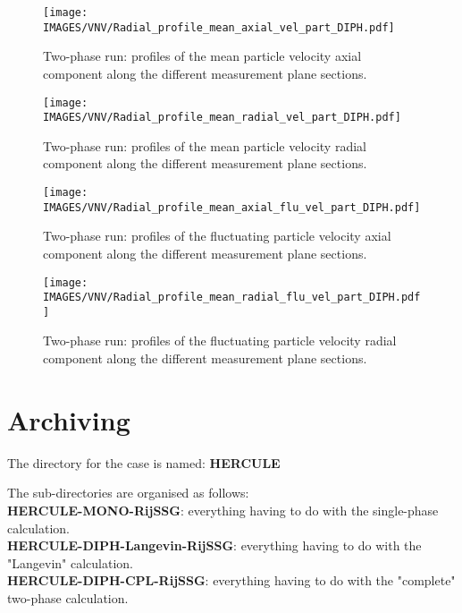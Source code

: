 \noindent

\begin{figure}[H]
   \centerline{\texttt{[image: \\IMAGES/VNV/Radial\_profile\_mean\_axial\_vel\_part\_DIPH.pdf]}}
   \caption{Two-phase run: profiles of the mean particle velocity axial component along the different measurement plane sections.}
   \label{VitZPart}
\end{figure}

\begin{figure}[H]
   \centerline{\texttt{[image: \\IMAGES/VNV/Radial\_profile\_mean\_radial\_vel\_part\_DIPH.pdf]}}
   \caption{Two-phase run: profiles of the mean particle velocity radial component along the different measurement plane sections.}
   \label{VitXPart}
\end{figure}

\begin{figure}[H]
   \centerline{\texttt{[image: \\IMAGES/VNV/Radial\_profile\_mean\_axial\_flu\_vel\_part\_DIPH.pdf]}}
   \caption{Two-phase run: profiles of the fluctuating particle velocity axial component along the different measurement plane sections.}
   \label{VitZpPart}
\end{figure}

\begin{figure}[H]
   \centerline{\texttt{[image: \\IMAGES/VNV/Radial\_profile\_mean\_radial\_flu\_vel\_part\_DIPH.pdf]}}
   \caption{Two-phase run: profiles of the fluctuating particle velocity radial component along the different measurement plane sections.}
   \label{VitXpPart}
\end{figure}

\clearpage

\section{Archiving}

The directory for the case is named: \textbf{HERCULE}

The sub-directories are organised as follows:
\medskip\\
\hspace*{2cm}\textbf{HERCULE-MONO-RijSSG}: everything having to do with the single-phase calculation.
\medskip\\
\hspace*{2cm}\textbf{HERCULE-DIPH-Langevin-RijSSG}: everything having to do with the "Langevin" calculation.
\medskip\\
\hspace*{2cm}\textbf{HERCULE-DIPH-CPL-RijSSG}: everything having to do with the "complete" two-phase calculation.



